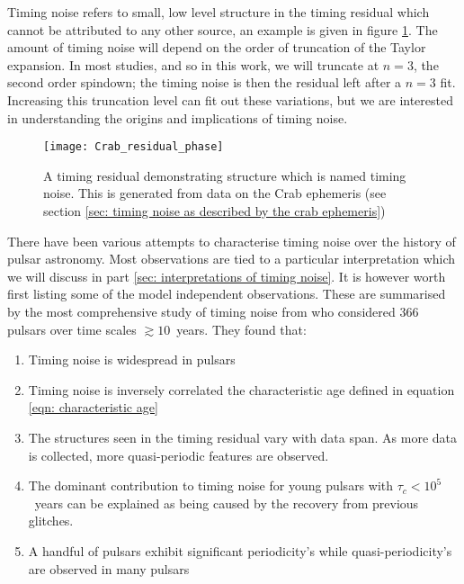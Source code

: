 Timing noise refers to small, low level structure in the timing residual which
cannot be attributed to any other source, an example is given in figure
\ref{fig: timing noise example}. The amount of timing noise will depend on the
order of truncation of the Taylor expansion.  In most studies, and so in this
work, we will truncate at $n=3$, the second order spindown; the timing noise is
then the residual left after a $n=3$ fit. Increasing this truncation level can
fit out these variations, but we are interested in understanding the origins
and implications of timing noise.

\begin{figure}[htb] 
    \centering
    \texttt{[image: Crab\_residual\_phase]}
    \caption{A timing residual demonstrating structure which is named timing
        noise.  This is generated from data on the Crab ephemeris (see section
    \ref{sec: timing noise as described by the crab ephemeris})}
    \label{fig: timing noise example}
\end{figure} 

There have been various attempts to characterise timing noise
over the history of 
pulsar astronomy. Most observations are tied to a particular interpretation
which we will discuss in part \ref{sec: interpretations of timing noise}.
It is however worth first listing some of the model independent observations.
These are summarised by the most comprehensive study of timing noise from 
\citet{Hobbs2010} who considered 366 pulsars over time scales $\gtrsim10$~years.
They found that:
\begin{enumerate}

    \item Timing noise is widespread in pulsars

    \item Timing noise is inversely correlated the characteristic age
        defined in equation \ref{eqn: characteristic age}

    \item The structures seen in the timing residual vary with data span. As
        more data is collected, more quasi-periodic features are observed.

    \item The dominant contribution to timing noise for young pulsars with
        $\tau_{c}<10^{5}$~years can be explained as being caused by the
        recovery from previous glitches.

    \item A handful of pulsars exhibit significant periodicity's while
        quasi-periodicity's are observed in many pulsars

\end{enumerate}


